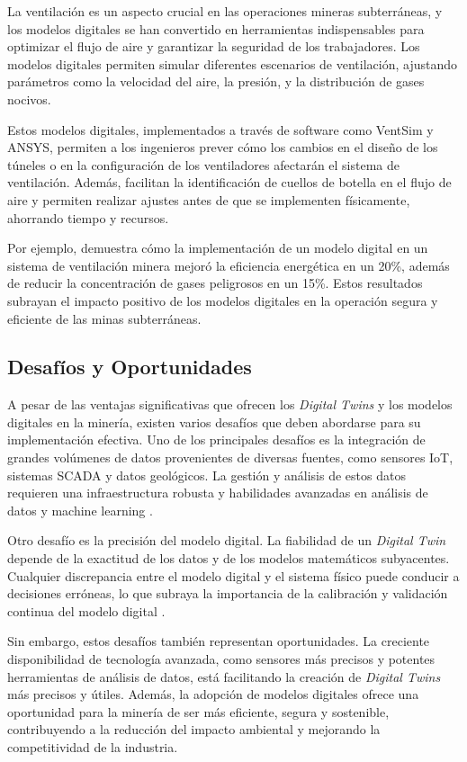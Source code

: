 La ventilación es un aspecto crucial en las operaciones mineras subterráneas, y los modelos digitales se han convertido en herramientas indispensables para optimizar el flujo de aire y garantizar la seguridad de los trabajadores. Los modelos digitales permiten simular diferentes escenarios de ventilación, ajustando parámetros como la velocidad del aire, la presión, y la distribución de gases nocivos.

Estos modelos digitales, implementados a través de software como VentSim y ANSYS, permiten a los ingenieros prever cómo los cambios en el diseño de los túneles o en la configuración de los ventiladores afectarán el sistema de ventilación. Además, facilitan la identificación de cuellos de botella en el flujo de aire y permiten realizar ajustes antes de que se implementen físicamente, ahorrando tiempo y recursos.

Por ejemplo, \cite{huang2022ventilation} demuestra cómo la implementación de un modelo digital en un sistema de ventilación minera mejoró la eficiencia energética en un 20\%, además de reducir la concentración de gases peligrosos en un 15\%. Estos resultados subrayan el impacto positivo de los modelos digitales en la operación segura y eficiente de las minas subterráneas.

\subsection{Desafíos y Oportunidades}

A pesar de las ventajas significativas que ofrecen los \textit{Digital Twins} y los modelos digitales en la minería, existen varios desafíos que deben abordarse para su implementación efectiva. Uno de los principales desafíos es la integración de grandes volúmenes de datos provenientes de diversas fuentes, como sensores IoT, sistemas SCADA y datos geológicos. La gestión y análisis de estos datos requieren una infraestructura robusta y habilidades avanzadas en análisis de datos y machine learning \cite{zhang2021iot}.

Otro desafío es la precisión del modelo digital. La fiabilidad de un \textit{Digital Twin} depende de la exactitud de los datos y de los modelos matemáticos subyacentes. Cualquier discrepancia entre el modelo digital y el sistema físico puede conducir a decisiones erróneas, lo que subraya la importancia de la calibración y validación continua del modelo digital \cite{greif2020calibration}.

Sin embargo, estos desafíos también representan oportunidades. La creciente disponibilidad de tecnología avanzada, como sensores más precisos y potentes herramientas de análisis de datos, está facilitando la creación de \textit{Digital Twins} más precisos y útiles. Además, la adopción de modelos digitales ofrece una oportunidad para la minería de ser más eficiente, segura y sostenible, contribuyendo a la reducción del impacto ambiental y mejorando la competitividad de la industria.

